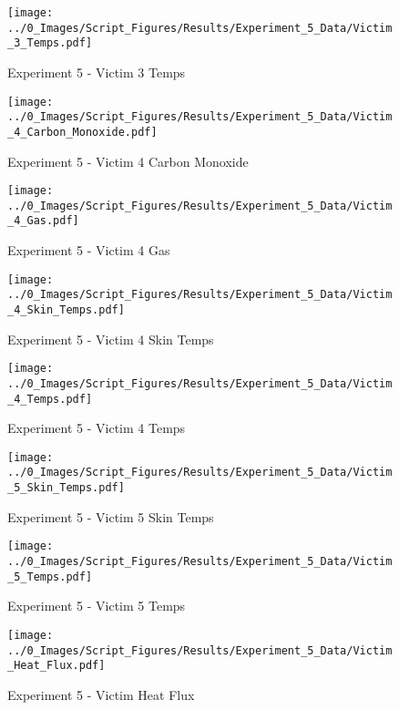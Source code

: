 	\clearpage

	\begin{figure}[H]
		\centering
		\texttt{[image: ../0\_Images/Script\_Figures/Results/Experiment\_5\_Data/Victim\_3\_Temps.pdf]}
		\caption[]{Experiment 5 - Victim 3 Temps}
	\end{figure}
 

	\begin{figure}[H]
		\centering
		\texttt{[image: ../0\_Images/Script\_Figures/Results/Experiment\_5\_Data/Victim\_4\_Carbon\_Monoxide.pdf]}
		\caption[]{Experiment 5 - Victim 4 Carbon Monoxide}
	\end{figure}
 
	\clearpage

	\begin{figure}[H]
		\centering
		\texttt{[image: ../0\_Images/Script\_Figures/Results/Experiment\_5\_Data/Victim\_4\_Gas.pdf]}
		\caption[]{Experiment 5 - Victim 4 Gas}
	\end{figure}
 

	\begin{figure}[H]
		\centering
		\texttt{[image: ../0\_Images/Script\_Figures/Results/Experiment\_5\_Data/Victim\_4\_Skin\_Temps.pdf]}
		\caption[]{Experiment 5 - Victim 4 Skin Temps}
	\end{figure}
 
	\clearpage

	\begin{figure}[H]
		\centering
		\texttt{[image: ../0\_Images/Script\_Figures/Results/Experiment\_5\_Data/Victim\_4\_Temps.pdf]}
		\caption[]{Experiment 5 - Victim 4 Temps}
	\end{figure}
 

	\begin{figure}[H]
		\centering
		\texttt{[image: ../0\_Images/Script\_Figures/Results/Experiment\_5\_Data/Victim\_5\_Skin\_Temps.pdf]}
		\caption[]{Experiment 5 - Victim 5 Skin Temps}
	\end{figure}
 
	\clearpage

	\begin{figure}[H]
		\centering
		\texttt{[image: ../0\_Images/Script\_Figures/Results/Experiment\_5\_Data/Victim\_5\_Temps.pdf]}
		\caption[]{Experiment 5 - Victim 5 Temps}
	\end{figure}
 

	\begin{figure}[H]
		\centering
		\texttt{[image: ../0\_Images/Script\_Figures/Results/Experiment\_5\_Data/Victim\_Heat\_Flux.pdf]}
		\caption[]{Experiment 5 - Victim Heat Flux}
	\end{figure}
 
